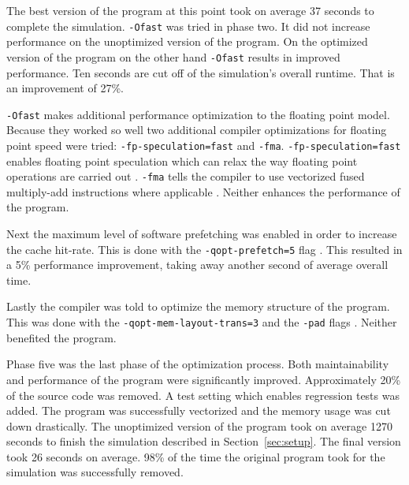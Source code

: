 \documentclass[twoside,11pt]{article}
\begin{document}
The best version of the program at this point took on average 37
seconds to complete the simulation.
\texttt{-Ofast} was tried in phase two.
It did not increase performance on the unoptimized version of the
program.
On the optimized version of the program on the other hand
\texttt{-Ofast} results in improved performance.
Ten seconds are cut off of the simulation's overall runtime. That
is an improvement of 27\%.

\texttt{-Ofast} makes additional performance optimization to the
floating point model.
Because they worked so well two additional compiler optimizations for
floating point speed were tried: \texttt{-fp-speculation=fast} and
\texttt{-fma}.
\texttt{-fp-speculation=fast} enables floating point speculation which
can relax the way floating point operations are carried out
\citep{fp_speculation}.
\texttt{-fma} tells the compiler to use vectorized fused multiply-add
instructions where applicable \citep{fma}.
Neither enhances the performance of the program.

Next the maximum level of software prefetching was enabled in order to
increase the cache hit-rate.
This is done with the \texttt{-qopt-prefetch=5} flag
\citep{qopt_prefetch}.
This resulted in a 5\% performance improvement, taking away another
second of average overall time.

Lastly the compiler was told to optimize the memory structure of the
program.
This was done with the \texttt{-qopt-mem-layout-trans=3} and the
\texttt{-pad} flags \citep{qopt_mem_layout_trans, pad}.
Neither benefited the program.

Phase five was the last phase of the optimization process.
Both maintainability and performance of the program were significantly
improved.
Approximately 20\% of the source code was removed.
A test setting which enables regression tests was added.
The program was successfully vectorized and the memory usage was cut
down drastically.
The unoptimized version of the program took on average 1270 seconds
to finish the simulation described in Section~\ref{sec:setup}.
The final version took 26 seconds on average.
98\% of the time the original program took for the simulation was
successfully removed.
\end{document}
